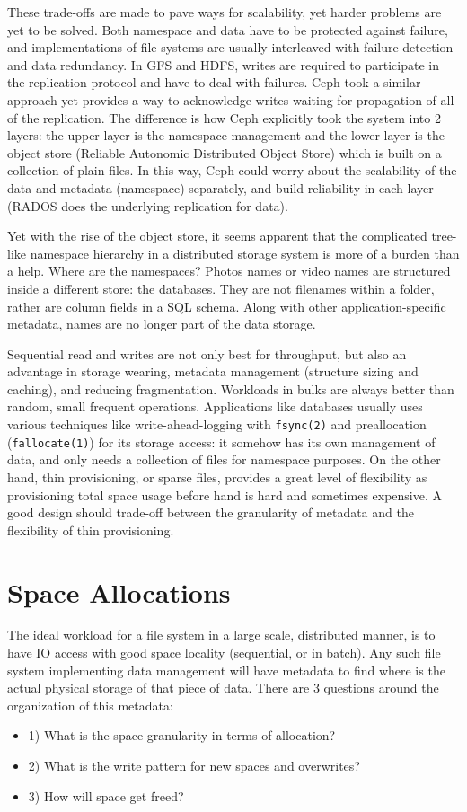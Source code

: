 These trade-offs are made to pave ways for scalability, yet harder problems
are yet to be solved. Both namespace and data have to be protected against
failure, and implementations of file systems are usually interleaved with
failure detection and data redundancy. In GFS and HDFS, writes are required
to participate in the replication protocol and have to deal with failures.
Ceph took a similar approach yet provides a way to acknowledge writes waiting
for propagation of all of the replication. The difference is how Ceph
explicitly took the system into 2 layers: the upper layer is the namespace
management and the lower layer is the object store (Reliable Autonomic
Distributed Object Store) which is built on a collection of plain files. In
this way, Ceph could worry about the scalability of the data and metadata
(namespace) separately, and build reliability in each layer (RADOS does the
underlying replication for data).

Yet with the rise of the object store, it seems apparent that the complicated
tree-like namespace hierarchy in a distributed storage system is more of a
burden than a help. Where are the namespaces? Photos names or video names are
structured inside a different store: the databases. They are not filenames
within a folder, rather are column fields in a SQL schema. Along with other
application-specific metadata, names are no longer part of the data storage.

Sequential read and writes are not only best for throughput, but also an
advantage in storage wearing, metadata management (structure sizing and
caching), and reducing fragmentation. Workloads in bulks are always better
than random, small frequent operations. Applications like databases usually
uses various techniques like write-ahead-logging with \texttt{fsync(2)} and
preallocation (\texttt{fallocate(1)}) for its storage access: it somehow has
its own management of data, and only needs a collection of files for
namespace purposes. On the other hand, thin provisioning, or sparse files,
provides a great level of flexibility as provisioning total space usage before
hand is hard and sometimes expensive. A good design should trade-off between
the granularity of metadata and the flexibility of thin provisioning.

\section{Space Allocations}
The ideal workload for a file system in a large scale, distributed manner, is 
to have IO access with good space locality (sequential, or in batch). Any such
file system implementing data management will have metadata to find where is the
actual physical storage of that piece of data. There are 3 questions around the
organization of this metadata:
\begin{itemize}
    \item 1) What is the space granularity in terms of allocation?
    \item 2) What is the write pattern for new spaces and overwrites?
    \item 3) How will space get freed?
\end{itemize}

